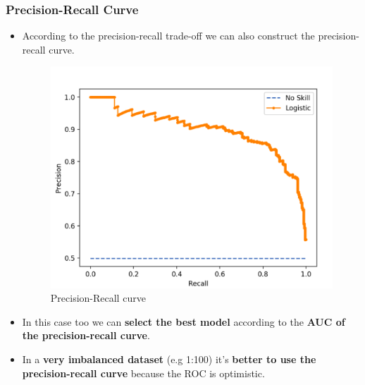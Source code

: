 \documentclass[9pt]{beamer}
\begin{document}
\begin{frame}
\frametitle{Precision-Recall Curve}
\begin{itemize}
\item<1-> According to the precision-recall trade-off we can also construct the precision-recall curve.
\vspace{2mm}
\begin{figure}[ht]
\includegraphics[scale=0.25]{images/precision-recall.png}
\caption{Precision-Recall curve}
\end{figure}
\item<2-> In this case too we can \textbf{select the best model} according to the \textbf{AUC of the precision-recall curve}.
\item<3 -> In a \textbf{very imbalanced dataset} (e.g 1:100) it's \textbf{better to use the precision-recall curve} because the ROC is optimistic.

\end{itemize}
\end{frame}
\end{document}
